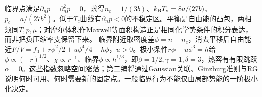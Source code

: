 临界点满足$\partial_np=\partial_n^2p=0$，求得$n_c=1/(3b)$、$k_{\mathrm B} T_c=8a/(27b)$、$p_c=a/(27b^2)$。低于$T_c$曲线有$\partial_np<0$的不稳定区。平衡是自由能的凸包，两相须同$T,p,\mu$；对摩尔体积作Maxwell等面积构造正是相同化学势条件的积分表达，而非把负压缩率支保留下来。
临界附近取密度差$\phi=n-n_c$，消去平移后自由能近$F/V=f_0+r\phi^2/2+u\phi^4/4-h\phi$，$u>0$。极小条件$r\phi+u\phi^3=h$给$\phi\propto(-r)^{1/2}$、$\chi\propto r^{-1}$、临界$\phi\propto h^{1/3}$，即$\beta=1/2,\gamma=1,\delta=3$，热容有有限跳跃$\alpha=0$。这些指数忽略空间涨落；第二编将通过Gaussian关联、Ginzburg准则与RG说明何时可用、何时需要新的固定点。一般临界行为不能仅由局部势能的一阶极小化决定。
